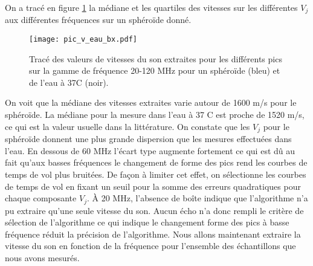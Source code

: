 On a tracé en figure \ref{vj_sphero_sn} la médiane et les quartiles des vitesses sur les différentes $V_j$ aux différentes fréquences sur un sphéroïde donné.
\begin{figure}[ht!]
\centering
\texttt{[image: pic\_v\_eau\_bx.pdf]}
\caption{Tracé des valeurs de vitesses du son extraites pour les différents pics sur la gamme de fréquence 20-120 MHz pour un sphéroïde (bleu) et de l'eau à 37\textdegree C (noir). \label{vj_sphero_sn}}
\end{figure}
On voit que la médiane des vitesses extraites varie autour de 1600 m/s pour le sphéroïde. La médiane pour la mesure dans l'eau à 37 \textdegree C est proche de 1520 m/s, ce qui est la valeur usuelle dans la littérature.\cite{Greenspan1957} On constate que les $V_j$ pour le sphéroïde donnent une plus grande dispersion que les mesures effectuées dans l'eau. En dessous de 60 MHz l'écart type augmente fortement  ce qui est dû au fait qu'aux basses fréquences le changement de forme des pics rend les courbes de temps de vol plus bruitées.  De façon à limiter cet effet, on sélectionne les courbes de temps de vol  en fixant un seuil pour la somme des erreurs quadratiques pour  chaque composante $V_j$. \`A  20 MHz, l'absence de boîte indique que l'algorithme n'a pu extraire qu'une seule vitesse du son. Aucun écho n'a donc rempli le critère de sélection de l'algorithme ce qui indique le changement forme des pics à basse fréquence réduit la précision de l'algorithme. Nous allons maintenant extraire la vitesse du son en fonction de la fréquence pour l'ensemble des échantillons que nous avons mesurés.


